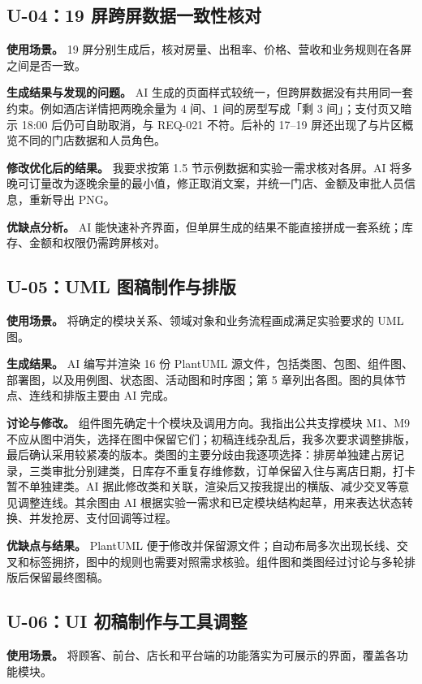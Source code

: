 \subsection{U-04：19 屏跨屏数据一致性核对}

\textbf{使用场景。} 19 屏分别生成后，核对房量、出租率、价格、营收和业务规则在各屏之间是否一致。

\textbf{生成结果与发现的问题。} AI 生成的页面样式较统一，但跨屏数据没有共用同一套约束。例如酒店详情把两晚余量为 4 间、1 间的房型写成「剩 3 间」；支付页又暗示 18:00 后仍可自助取消，与 REQ-021 不符。后补的 17--19 屏还出现了与片区概览不同的门店数据和人员角色。

\textbf{修改优化后的结果。} 我要求按第 1.5 节示例数据和实验一需求核对各屏。AI 将多晚可订量改为逐晚余量的最小值，修正取消文案，并统一门店、金额及审批人员信息，重新导出 PNG。

\textbf{优缺点分析。} AI 能快速补齐界面，但单屏生成的结果不能直接拼成一套系统；库存、金额和权限仍需跨屏核对。

\subsection{U-05：UML 图稿制作与排版}

\textbf{使用场景。} 将确定的模块关系、领域对象和业务流程画成满足实验要求的 UML 图。

\textbf{生成结果。} AI 编写并渲染 16 份 PlantUML 源文件，包括类图、包图、组件图、部署图，以及用例图、状态图、活动图和时序图；第 5 章列出各图。图的具体节点、连线和排版主要由 AI 完成。

\textbf{讨论与修改。} 组件图先确定十个模块及调用方向。我指出公共支撑模块 M1、M9 不应从图中消失，选择在图中保留它们；初稿连线杂乱后，我多次要求调整排版，最后确认采用较紧凑的版本。类图的主要分歧由我逐项选择：排房单独建占房记录，三类审批分别建类，日库存不重复存维修数，订单保留入住与离店日期，打卡暂不单独建类。AI 据此修改类和关联，渲染后又按我提出的横版、减少交叉等意见调整连线。其余图由 AI 根据实验一需求和已定模块结构起草，用来表达状态转换、并发抢房、支付回调等过程。

\textbf{优缺点与结果。} PlantUML 便于修改并保留源文件；自动布局多次出现长线、交叉和标签拥挤，图中的规则也需要对照需求核验。组件图和类图经过讨论与多轮排版后保留最终图稿。

\subsection{U-06：UI 初稿制作与工具调整}

\textbf{使用场景。} 将顾客、前台、店长和平台端的功能落实为可展示的界面，覆盖各功能模块。

